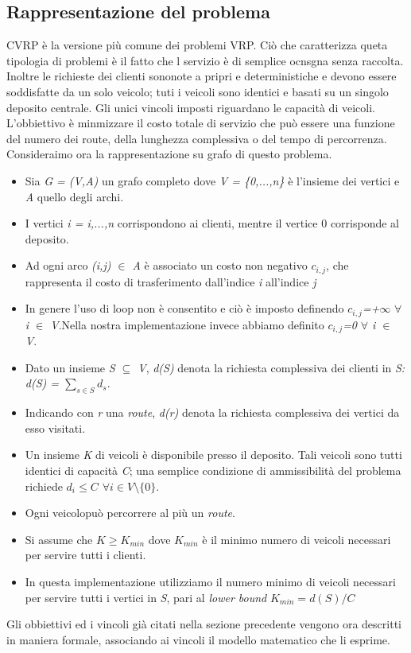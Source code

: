 \documentclass[]{article}
\begin{document}
\newpage
\subsection{Rappresentazione del problema} \label{RappProb-sec}
CVRP è la versione più comune dei problemi VRP. Ciò che caratterizza queta tipologia di problemi è il fatto che l servizio è di semplice ocnsgna senza raccolta.
Inoltre le richieste dei clienti sononote a pripri e deterministiche e devono essere soddisfatte da un solo veicolo; tuti i veicoli sono identici e basati su un singolo deposito centrale. Gli unici vincoli imposti riguardano le capacità di veicoli. L'obbiettivo è minmizzare il costo totale di servizio che può essere una funzione del numero dei route, della lunghezza complessiva o del tempo di percorrenza.
Consideraimo ora la rappresentazione su grafo di questo problema.
\begin{itemize}
\item Sia \emph{G = (V,A)} un grafo completo dove \emph{V = \{0,...,n\}} è l'insieme dei vertici e \emph{A} quello degli archi.
\item I vertici \emph{i = i,...,n} corrispondono ai clienti, mentre il vertice 0 corrisponde al deposito. 
\item Ad ogni arco \emph{(i,j) $\in$ A} è associato un costo non negativo \emph{$c_{i,j}$}, che rappresenta il costo di trasferimento dall'indice \emph{i} all'indice \emph{j}
\item In genere l'uso di loop non è consentito e ciò è imposto definendo \emph{$c_{i,j}$=+$\infty$}  \emph{ $\forall$ i $\in$ V}.Nella nostra implementazione invece abbiamo definito  \emph{$c_{i,j}$=0}  \emph{ $\forall$ i $\in$ V}.
\item Dato un insieme \emph{ S $\subseteq$ V}, \emph{d(S)} denota la richiesta complessiva dei clienti in \emph{S: d(S) = $\sum_{s \in S} d_{s} $}.
\item  Indicando con \emph{r} una \emph{route}, \emph{d(r)} denota la richiesta complessiva dei vertici da esso visitati.
\item Un insieme \emph{K} di veicoli è disponibile presso il deposito. Tali veicoli sono tutti identici di capacità \emph{C}; una semplice condizione di ammissibilità del problema richiede \emph{$ d_{i} \leq C $ $ \forall i \in V \setminus \{0\} $}.
\item Ogni veicolopuò percorrere al più un \emph{route}.
\item Si assume che \emph{$K \geq K_{min}$} dove \emph{$K_{min}$} è il minimo numero di veicoli necessari per servire tutti i clienti.
\item In questa implementazione utilizziamo il numero minimo di veicoli necessari per servire tutti i vertici in \emph{S}, pari al  \emph{lower bound}  \emph{$ K_{min} =d(S)/C $}
\end{itemize}
Gli obbiettivi ed i vincoli già citati nella sezione precedente vengono ora descritti in maniera formale, associando ai vincoli il modello matematico che li esprime.
\end{document}
